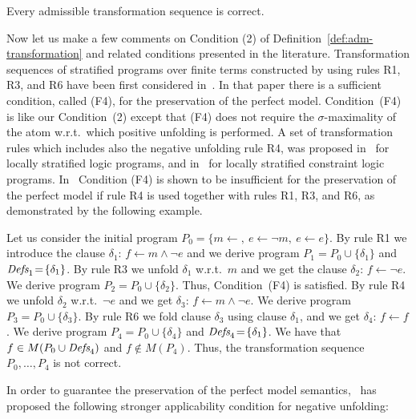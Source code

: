 \documentclass[english]{tlp}
\newcommand{\Mathit}[1]{\mbox{\it #1}}
\newcommand{\Defs}{\Mathit{Defs}}
\begin{document}
\begin{theorem}\label{th:corr_of_rules} Every admissible transformation
sequence is correct.
\end{theorem}

Now let us make a few comments on Condition (2) of
Definition~\ref{def:adm-transformation} and related conditions
presented in the literature. Transformation sequences of stratified
programs over finite terms constructed by using rules R1, R3, and R6
have been first considered in~\cite{Sek91}. In that paper there is a
sufficient condition, called (F4), for the preservation of the
perfect model. Condition~(F4) is like our Condition~(2) except that (F4) 
does not require the $\sigma$-maximality of the atom w.r.t.~which positive
unfolding is performed. A set of transformation rules which includes
also the negative unfolding rule R4, was proposed in~\cite{PeP00a}
for locally stratified logic programs, and in~\cite{Fi&04a} for
locally stratified constraint logic programs. 
In~\cite{Sek09} Condition (F4) is shown
to be insufficient for the preservation of the perfect model if
rule R4 is used together with rules R1, R3, and R6, as demonstrated
by the following example.

\begin{example}
\label{ex:seki} Let us consider the initial program  $P_0 = \{m
\leftarrow, \ e \leftarrow \neg m, \ e \leftarrow e\}$.
By rule R1 we introduce the clause 
$\delta_1$: $f\leftarrow m \wedge
\neg e$ 
and we derive program $P_1\!=\! P_0 \!\cup\! \{\delta_1\}$ and $\Defs_1\!=\!\{\delta_1\}$. 
By rule R3 we unfold $\delta_1$ w.r.t.~$m$ and we get the clause
$\delta_2$: $f\leftarrow \neg e$.
We derive program $P_2\!=\!P_0 \cup \{\delta_2\}$. Thus, Condition~(F4) is satisfied.
By rule R4 we unfold  $\delta_2$ w.r.t.~$\neg e$
and we get 
$\delta_3$: $f\leftarrow m \wedge \neg e$.
We derive program $P_3=P_0 \cup \{\delta_3\}$.
By rule R6 we fold clause $\delta_3$ using clause $\delta_1$, and we get 
$\delta_4$: $f\leftarrow f$. 
\noindent
We derive program $P_4=P_0\cup\{\delta_4\}$ and $\Defs_4\!=\!\{\delta_1\}$. We have that $f\in
M(P_0\cup\mbox{\Defs}_4)$ and $f\not\in M(P_4)$.  Thus, the 
transformation sequence $P_0,\ldots,P_4$ is not correct.
\end{example}

In order to guarantee the preservation of the perfect model
semantics,~\cite{Sek09} has proposed the following stronger
applicability condition for negative unfolding:
\end{document}
